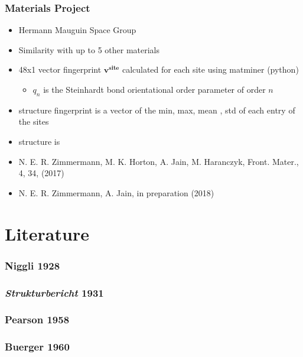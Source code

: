 \documentclass[11pt]{article}
\providecommand{\tightlist}{%
      \setlength{\itemsep}{0pt}\setlength{\parskip}{0pt}}
\begin{document}
    \subsubsection{Materials Project}\label{materials-project}

\begin{itemize}
\tightlist
\item
  Hermann Mauguin Space Group
\item
  Similarity with up to 5 other materials
\item
  48x1 vector fingerprint \(\mathbf{v^{site}}\) calculated for each site
  using matminer (python)

  \begin{itemize}
  \tightlist
  \item
    \(q_n\) is the Steinhardt bond orientational order parameter of
    order \(n\)
  \end{itemize}
\item
  structure fingerprint is a vector of the min, max, mean , std of each
  entry of the sites
\item
  structure is\\
\item
  N. E. R. Zimmermann, M. K. Horton, A. Jain, M. Haranczyk, Front.
  Mater., 4, 34, (2017)
\item
  N. E. R. Zimmermann, A. Jain, in preparation (2018)
\end{itemize}

    \section{Literature}\label{literature}

    \subsubsection{Niggli 1928}\label{niggli-1928}

    \subsubsection{\texorpdfstring{\emph{Strukturbericht}
1931}{Strukturbericht 1931}}\label{strukturbericht-1931}

    \subsubsection{Pearson 1958}\label{pearson-1958}

    \subsubsection{Buerger 1960}\label{buerger-1960}
\end{document}
